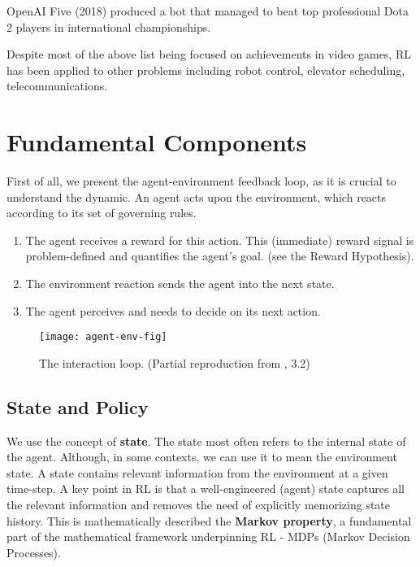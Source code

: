 OpenAI Five (2018)\cite{openai-dota} produced a bot that managed to beat top professional Dota 2 players in international championships.

Despite most of the above list being focused on achievements in video games, RL has been applied to other problems including robot control, elevator scheduling, telecommunications\cite{wiki:Reinforcement_learning}.

\section{Fundamental Components}

First of all, we present the agent-environment feedback loop, as it is crucial to understand the dynamic. An agent acts upon the environment, which reacts according to its set of governing rules.
\begin{enumerate}
    \item The agent receives a reward for this action. This (immediate) reward signal is problem-defined and quantifies the agent’s goal. (see the Reward Hypothesis).
    \item The environment reaction sends the agent into the next state.
    \item The agent perceives and needs to decide on its next action.
\end{enumerate}

\begin{figure}[h]
    \caption{The interaction loop. (Partial reproduction from \cite{rlai}, 3.2)}
    \centering
    \vspace*{0.5cm}
    \texttt{[image: agent-env-fig]}
\end{figure}

\subsection{State and Policy}

We use the concept of \textbf{state}. The state most often refers to the internal state of the agent. Although, in some contexts, we can use it to mean the environment state.
A state contains relevant information from the environment at a given time-step.
A key point in RL is that a well-engineered (agent) state captures all the relevant information and removes the need of explicitly memorizing state history.
This is mathematically described the \textbf{Markov property}\cite{silver-lectures}, a fundamental part of the mathematical framework underpinning RL - MDPs (Markov Decision Processes).

